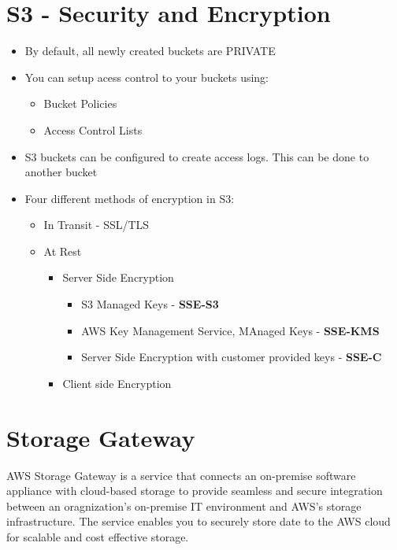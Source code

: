 \documentclass{article}
\begin{document}
\section{S3 - Security and Encryption}
\begin{itemize}
\item
By default, all newly created buckets are PRIVATE

\item
You can setup acess control to your buckets using:
	\begin{itemize}
	\item
	Bucket Policies
	
	\item
	Access Control Lists
	\end{itemize}

\item
S3 buckets can be configured to create access logs. This can be done to another bucket

\item
Four different methods of encryption in S3:
	\begin{itemize}
	\item
	In Transit - SSL/TLS
	
	\item
	At Rest
		\begin{itemize}
		\item
		Server Side Encryption
			\begin{itemize}
			\item
			S3 Managed Keys - \textbf{SSE-S3}
			
			\item
			AWS Key Management Service, MAnaged Keys - \textbf{SSE-KMS}
			
			\item
			Server Side Encryption with customer provided keys - \textbf{SSE-C}
			\end{itemize}
			
		\item
		Client side Encryption
	
		\end{itemize}
	\end{itemize}
\end{itemize}

\section{Storage Gateway}

AWS Storage Gateway is a service that connects an on-premise software appliance with cloud-based storage to provide seamless and secure integration between an oragnization's on-premise IT environment and AWS's storage infrastructure. The service enables you to securely store date to the AWS cloud for scalable and cost effective storage.\\
\end{document}
